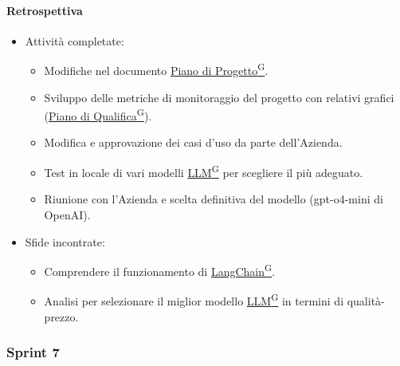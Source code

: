 \documentclass{article}
\begin{document}
                \paragraph{Retrospettiva}
                \begin{itemize}
                    \item Attività completate:
                    \begin{itemize}
                        \item Modifiche nel documento \href{https://code7crusaders.github.io/docs/RTB/documentazione_interna/glossario.html#piano-di-progetto}{Piano di Progetto\textsuperscript{G}}.
                        \item Sviluppo delle metriche di monitoraggio del progetto con relativi grafici (\href{https://code7crusaders.github.io/docs/RTB/documentazione_interna/glossario.html#piano-di-qualifica}{Piano di Qualifica\textsuperscript{G}}).
                        \item Modifica e approvazione dei casi d'uso da parte dell'Azienda.
                        \item Test in locale di vari modelli \href{https://code7crusaders.github.io/docs/RTB/documentazione_interna/glossario.html#llm-large-language-model}{LLM\textsuperscript{G}} per scegliere il più adeguato.
                        \item Riunione con l'Azienda e scelta definitiva del modello (gpt-o4-mini di OpenAI).
                    \end{itemize}
                    \item Sfide incontrate:
                    \begin{itemize}
                        \item Comprendere il funzionamento di \href{https://code7crusaders.github.io/docs/RTB/documentazione_interna/glossario.html#langchain}{LangChain\textsuperscript{G}}.
                        \item Analisi per selezionare il miglior modello \href{https://code7crusaders.github.io/docs/RTB/documentazione_interna/glossario.html#llm-large-language-model}{LLM\textsuperscript{G}} in termini di qualità-prezzo.
                    \end{itemize}
                \end{itemize}
            \subsubsection{Sprint 7}
\end{document}
